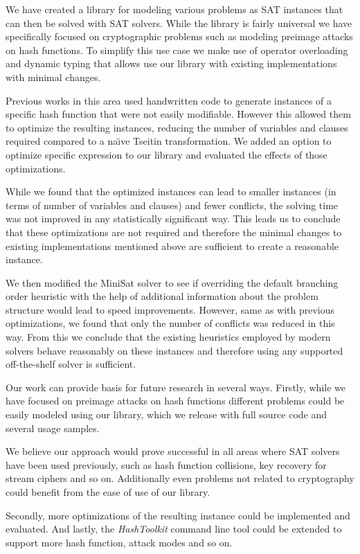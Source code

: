 We have created a library for modeling various problems as SAT instances that can then be solved with SAT solvers.
While the library is fairly universal we have specifically focused on cryptographic problems such as modeling preimage attacks on hash functions.
To simplify this use case we make use of operator overloading and dynamic typing that allows use our library with existing implementations with minimal changes.

Previous works in this area used handwritten code to generate instances of a specific hash function that were not easily modifiable.
However this allowed them to optimize the resulting instances, reducing the number of variables and clauses required compared to a na\"{\i}ve Tseitin transformation.
We added an option to optimize specific expression to our library and evaluated the effects of those optimizations.

While we found that the optimized instances can lead to smaller instances (in terms of number of variables and clauses) and fewer conflicts, the solving time was not improved in any statistically significant way.
This leads us to conclude that these optimizations are not required and therefore the minimal changes to existing implementations mentioned above are sufficient to create a reasonable instance.

We then modified the MiniSat solver to see if overriding the default branching order heuristic with the help of additional information about the problem structure would lead to speed improvements.
However, same as with previous optimizations, we found that only the number of conflicts was reduced in this way.
From this we conclude that the existing heuristics employed by modern solvers behave reasonably on these instances and therefore using any supported off-the-shelf solver is sufficient.

Our work can provide basis for future research in several ways.
Firstly, while we have focused on preimage attacks on hash functions different problems could be easily modeled using our library, which we release with full source code and several usage samples.

We believe our approach would prove successful in all areas where SAT solvers have been used previously, such as hash function collisions, key recovery for stream ciphers and so on.
Additionally even problems not related to cryptography could benefit from the ease of use of our library.

Secondly, more optimizations of the resulting instance could be implemented and evaluated.
And lastly, the \emph{HashToolkit} command line tool could be extended to support more hash function, attack modes and so on.
